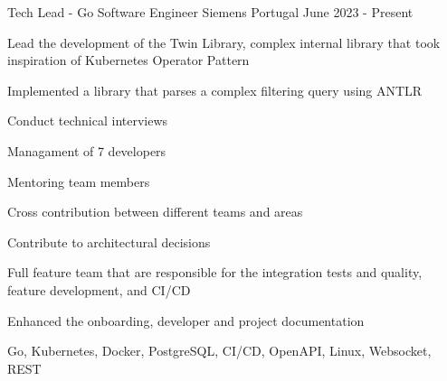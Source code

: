

\begin{cventries}

  \cventry
    {Tech Lead - Go Software Engineer} %
    {Siemens} %
    {Portugal} %
    {June 2023 - Present} %
    {
      \begin{cvitems} %
        \item {Lead the development of the Twin Library, complex internal library that took inspiration of Kubernetes Operator Pattern}
        \item {Implemented a library that parses a complex filtering query using ANTLR}
        \item {Conduct technical interviews}
        \item {Managament of 7 developers}
        \item {Mentoring team members}
        \item {Cross contribution between different teams and areas}
        \item {Contribute to architectural decisions}
        \item {Full feature team that are responsible for the integration tests and quality, feature development, and CI/CD}
        \item {Enhanced the onboarding, developer and project documentation}
        \item {Go, Kubernetes, Docker, PostgreSQL, CI/CD, OpenAPI, Linux, Websocket, REST}
      \end{cvitems}
    }


\end{cventries}
